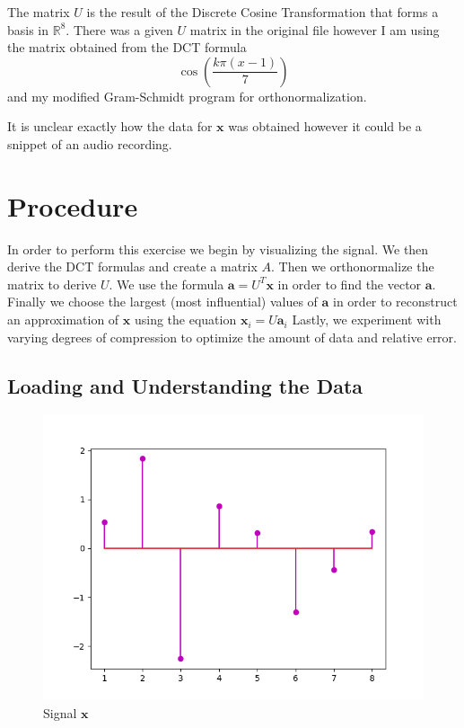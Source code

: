 \documentclass{article}
\newcommand{\bs}[1]{\boldsymbol{#1}}
\begin{document}
The matrix $U$ is the result of the Discrete Cosine Transformation that forms a basis in $\mathbb{R}^8$. There was a given $U$ matrix in the original file however I am using the matrix obtained from the DCT formula 
$$\cos\left(\frac{k \pi (x - 1)}{7}\right)$$
 and my modified Gram-Schmidt program for orthonormalization.

It is unclear exactly how the data for $\bs{x}$ was obtained however it could be a snippet of an audio recording. 

\section{Procedure}

In order to perform this exercise we begin by visualizing the signal. We then derive the DCT formulas and create a matrix $A$. Then we orthonormalize the matrix to derive $U$. We use the formula $\bs{a} = U^T\bs{x}$ in order to find the vector $\bs{a}$. Finally we choose the largest (most influential) values of $\bs{a}$ in order to reconstruct an approximation of $\bs{x}$ using the equation $\bs{x}_i = U\bs{a}_i$ Lastly, we experiment with varying degrees of compression to optimize the amount of data and relative error. 

\subsection{Loading and Understanding the Data}

\begin{figure}[h!]
	\centering
	\includegraphics[scale=0.5]{CA_01Figure_1.png}
	\caption{Signal $\bs{x}$}
	\label{fig: FIG 01}
\end{figure}
\end{document}
